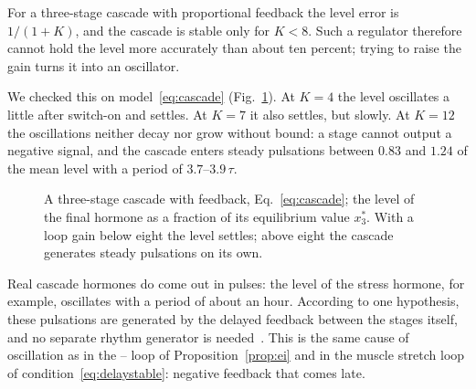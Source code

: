 \begin{keyblock}
\begin{proposition}
\label{prop:cascade}
For a three-stage cascade with proportional feedback the level error is $1/(1+K)$, and the cascade is stable only for $K<8$. Such a regulator therefore cannot hold the level more accurately than about ten percent; trying to raise the gain turns it into an oscillator.
\end{proposition}
\end{keyblock}

We checked this on model~\eqref{eq:cascade} (Fig.~\ref{fig:cascade}). At $K=4$ the level oscillates a little after switch-on and settles. At $K=7$ it also settles, but slowly. At $K=12$ the oscillations neither decay nor grow without bound: a stage cannot output a negative signal, and the cascade enters steady pulsations between $0.83$ and $1.24$ of the mean level with a period of $3.7$--$3.9\,\tau$.

\begin{figure}[t]
\centering
{}
\caption{A three-stage cascade with feedback, Eq.~\eqref{eq:cascade}; the level of the final hormone as a fraction of its equilibrium value $x_3^*$. With a loop gain below eight the level settles; above eight the cascade generates steady pulsations on its own.}
\label{fig:cascade}
\end{figure}

Real cascade hormones do come out in pulses: the level of the stress hormone, for example, oscillates with a period of about an hour. According to one hypothesis, these pulsations are generated by the delayed feedback between the stages itself, and no separate rhythm generator is needed~\cite{Walker2010}. This is the same cause of oscillation as in the -- loop of Proposition~\ref{prop:ei} and in the muscle stretch loop of condition~\eqref{eq:delaystable}: negative feedback that comes late.

